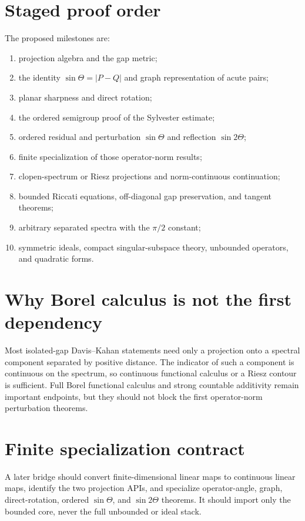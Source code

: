 \documentclass{article}
\begin{document}
\section{Staged proof order}
The proposed milestones are:
\begin{enumerate}
\item projection algebra and the gap metric;
\item the identity $\sin\Theta=|P-Q|$ and graph representation of acute pairs;
\item planar sharpness and direct rotation;
\item the ordered semigroup proof of the Sylvester estimate;
\item ordered residual and perturbation $\sin\Theta$ and reflection
      $\sin 2\Theta$;
\item finite specialization of those operator-norm results;
\item clopen-spectrum or Riesz projections and norm-continuous continuation;
\item bounded Riccati equations, off-diagonal gap preservation, and tangent
      theorems;
\item arbitrary separated spectra with the $\pi/2$ constant;
\item symmetric ideals, compact singular-subspace theory, unbounded operators,
      and quadratic forms.
\end{enumerate}

\section{Why Borel calculus is not the first dependency}
Most isolated-gap Davis--Kahan statements need only a projection onto a
spectral component separated by positive distance.  The indicator of such a
component is continuous on the spectrum, so continuous functional calculus
or a Riesz contour is sufficient.  Full Borel functional calculus and strong
countable additivity remain important endpoints, but they should not block the
first operator-norm perturbation theorems.

\section{Finite specialization contract}
A later bridge should convert finite-dimensional linear maps to continuous
linear maps, identify the two projection APIs, and specialize operator-angle,
graph, direct-rotation, ordered $\sin\Theta$, and $\sin 2\Theta$ theorems.  It
should import only the bounded core, never the full unbounded or ideal stack.
\end{document}
